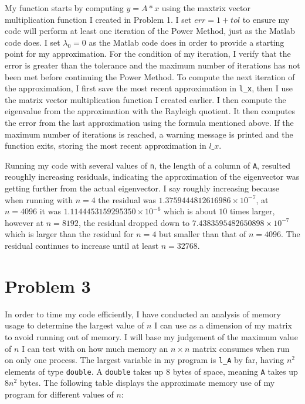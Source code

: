 \documentclass[11pt]{article}
\begin{document}
My function starts by computing $y=A*x$ using the maxtrix vector multiplication function I created in Problem 1. I set $err=1+tol$ to ensure my code will perform at least one iteration of the Power Method, just as the Matlab code does. I set $\lambda_{0}=0$ as the Matlab code does in order to provide a starting point for my approximation. For the condition of my iteration, I verify that the error is greater than the tolerance and the maximum number of iterations has not been met before continuing the Power Method. To compute the next iteration of the approximation, I first save the most recent approximation in \texttt{l\_x}, then I use the matrix vector multiplication function I created earlier. I then compute the eigenvalue from the approximation with the Rayleigh quotient. It then computes the error from the last approximation using the formula mentioned above. If the maximum number of iterations is reached, a warning message is printed and the function exits, storing the most recent approximation in $ l\_x $.

Running my code with several values of \texttt{n}, the length of a column of \texttt{A}, resulted reoughly increasing residuals, indicating the approximation of the eigenvector was getting further from the actual eigenvector. I say roughly increasing because when running with $n=4$ the residual was $1.3759444812616986\times 10^{-7}$, at $n=4096$ it was $1.1144453159295350\times 10^{-6}$ which is about $10$ times larger, however at $n=8192$, the residual dropped down to $7.4383595482650898\times 10^{-7}$ which is larger than the residual for $n=4$ but smaller than that of $n=4096$. The residual continues to increase until at least $n=32768$.
\pagebreak

\section{Problem 3}
In order to time my code efficiently, I have conducted an analysis of memory usage to determine the largest value of $n$ I can use as a dimension of my matrix to avoid running out of memory. I will base my judgement of the maximum value of $n$ I can test with on how much memory an $n \times n$ matrix consumes when run on only one process. The largest variable in my program is \texttt{l\_A} by far, having $n^2$ elements of type \texttt{double}. A \texttt{double} takes up $8$ bytes of space, meaning \texttt{A} takes up $8n^2$ bytes. The following table displays the approximate memory use of my program for different values of $n$:
\end{document}

